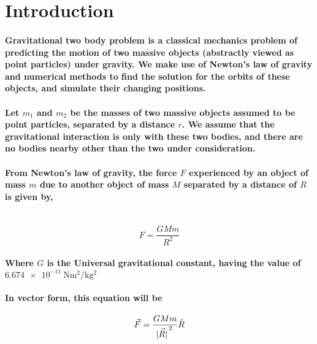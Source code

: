 \section{Introduction}

\paragraph
{
    Gravitational two body problem is a classical mechanics problem of predicting the motion of two massive objects (abstractly viewed as point particles) under gravity. We make use of Newton's law of gravity and numerical methods to find the solution for the orbits of these objects, and simulate their changing positions.
}

\paragraph
{
    Let $m_1$ and $m_2$ be the masses of two massive objects assumed to be point particles, separated by a distance $r$. We assume that the gravitational interaction is only with these two bodies, and there are no bodies nearby other than the two under consideration.
}

\paragraph
{
    From Newton's law of gravity, the force $F$ experienced by an object of mass $m$ due to another object of mass $M$ separated by a distance of $R$ is given by,\\\\
}
\begin{equation}
    F = \frac{G M m}{R^2}
\end{equation}

\paragraph{Where $G$ is the Universal gravitational constant, having the value of
$\SI{6.674e-11}{\newton \metre^2 \per \kg ^2}$}

\paragraph{In vector form, this equation will be}

\begin{equation}
    \vec{F} = \frac{G M m}{\vec{\abs{R}}^{\, 2}} \hat{R}
\end{equation}

